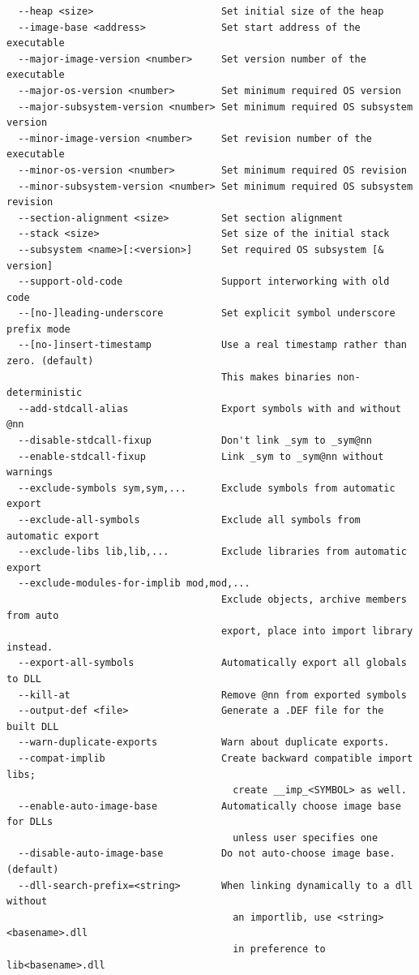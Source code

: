 \documentclass{article}
\begin{document}
\begin{lstlisting}
  --heap <size>                      Set initial size of the heap
  --image-base <address>             Set start address of the executable
  --major-image-version <number>     Set version number of the executable
  --major-os-version <number>        Set minimum required OS version
  --major-subsystem-version <number> Set minimum required OS subsystem version
  --minor-image-version <number>     Set revision number of the executable
  --minor-os-version <number>        Set minimum required OS revision
  --minor-subsystem-version <number> Set minimum required OS subsystem revision
  --section-alignment <size>         Set section alignment
  --stack <size>                     Set size of the initial stack
  --subsystem <name>[:<version>]     Set required OS subsystem [& version]
  --support-old-code                 Support interworking with old code
  --[no-]leading-underscore          Set explicit symbol underscore prefix mode
  --[no-]insert-timestamp            Use a real timestamp rather than zero. (default)
                                     This makes binaries non-deterministic
  --add-stdcall-alias                Export symbols with and without @nn
  --disable-stdcall-fixup            Don't link _sym to _sym@nn
  --enable-stdcall-fixup             Link _sym to _sym@nn without warnings
  --exclude-symbols sym,sym,...      Exclude symbols from automatic export
  --exclude-all-symbols              Exclude all symbols from automatic export
  --exclude-libs lib,lib,...         Exclude libraries from automatic export
  --exclude-modules-for-implib mod,mod,...
                                     Exclude objects, archive members from auto
                                     export, place into import library instead.
  --export-all-symbols               Automatically export all globals to DLL
  --kill-at                          Remove @nn from exported symbols
  --output-def <file>                Generate a .DEF file for the built DLL
  --warn-duplicate-exports           Warn about duplicate exports.
  --compat-implib                    Create backward compatible import libs;
                                       create __imp_<SYMBOL> as well.
  --enable-auto-image-base           Automatically choose image base for DLLs
                                       unless user specifies one
  --disable-auto-image-base          Do not auto-choose image base. (default)
  --dll-search-prefix=<string>       When linking dynamically to a dll without
                                       an importlib, use <string><basename>.dll
                                       in preference to lib<basename>.dll

\end{lstlisting}
\end{document}
